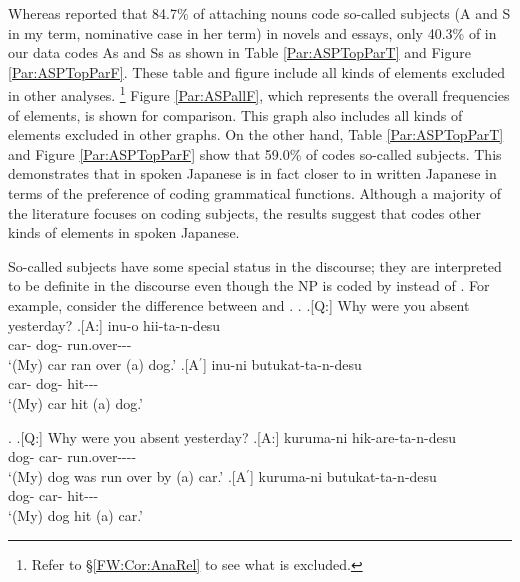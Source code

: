 Whereas  reported that
84.7\% of  attaching nouns code so-called subjects (A and S in my term, nominative case in her term) in novels and essays,
only 40.3\% of  in our data codes As and Ss
as shown in Table \ref{Par:ASPTopParT} and Figure \ref{Par:ASPTopParF}.
These table and figure include all kinds of elements excluded in other analyses.%
 \footnote{
 Refer to \S \ref{FW:Cor:AnaRel} to see what is excluded.
 }
Figure \ref{Par:ASPallF},
which represents the overall frequencies of elements,
is shown for comparison.
This graph also includes all kinds of elements excluded in other graphs.
On the other hand, Table \ref{Par:ASPTopParT} and Figure \ref{Par:ASPTopParF} show that
59.0\% of  codes so-called subjects.
This demonstrates that
 in spoken Japanese is in fact closer to  in written Japanese
in terms of the preference of coding grammatical functions. %
Although a majority of the literature focuses on  coding subjects,
the results suggest that  codes other kinds of elements in spoken Japanese.

So-called subjects have some special status in the discourse;
they are interpreted to be definite in the discourse
even though the NP is coded by  instead of .
For example,
consider the difference between \Next and \NNext.
%
\ex.
 \a.[Q:] Why were you absent yesterday?
 \bg.[A:]  inu-o hii-ta-n-desu \\
		car- dog- run.over--- \\
		`(My) car ran over (a) dog.'
 \bg.[A$^{\prime}$]  inu-ni butukat-ta-n-desu \\
   car- dog- hit--- \\
   `(My) car hit (a) dog.'
	
\ex. \a.[Q:] Why were you absent yesterday?
	\bg.[A:]  kuruma-ni hik-are-ta-n-desu \\
		dog- car- run.over---- \\
		`(My) dog was run over by (a) car.'
 \bg.[A$^{\prime}$]  kuruma-ni butukat-ta-n-desu \\
   dog- car- hit--- \\
   `(My) dog hit (a) car.'

